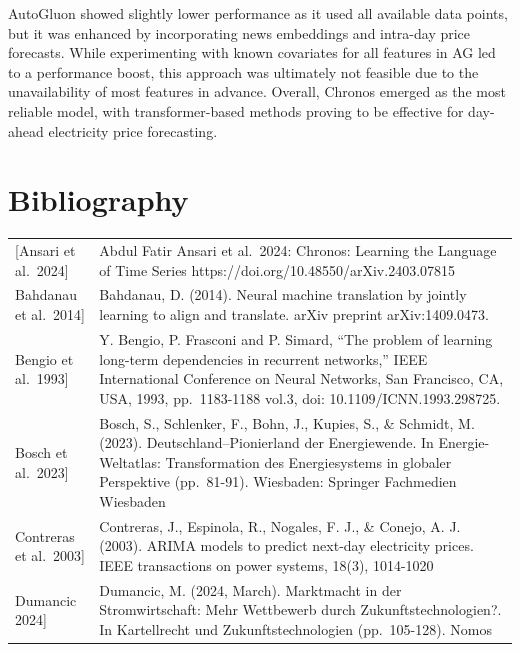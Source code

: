 \documentclass[a4paper]{article}
\begin{document}
AutoGluon showed slightly lower performance as it used all available
data points, but it was enhanced by incorporating news embeddings and
intra-day price forecasts. While experimenting with known covariates for
all features in AG led to a performance boost, this approach was
ultimately not feasible due to the unavailability of most features in
advance. Overall, Chronos emerged as the most reliable model, with
transformer-based methods proving to be effective for day-ahead
electricity price forecasting.

    \newpage
\section{Bibliography}\label{bibliography}

{\fontsize{8pt}{10pt}\selectfont\begin{longtable}[]{@{}
  >{\raggedright\arraybackslash}p{}
  >{\raggedright\arraybackslash}p{}@{}}
\toprule\noalign{}
\endhead
\bottomrule\noalign{}
\endlastfoot
{[}Ansari et al.~2024{]} & Abdul Fatir Ansari et al.~2024: Chronos:
Learning the Language of Time Series
https://doi.org/10.48550/arXiv.2403.07815 \\
{[}Bahdanau et al.~2014{]} & Bahdanau, D. (2014). Neural machine
translation by jointly learning to align and translate. arXiv preprint
arXiv:1409.0473. \\
{[}Bengio et al.~1993{]} & Y. Bengio, P. Frasconi and P. Simard, ``The
problem of learning long-term dependencies in recurrent networks,'' IEEE
International Conference on Neural Networks, San Francisco, CA, USA,
1993, pp.~1183-1188 vol.3, doi: 10.1109/ICNN.1993.298725. \\
{[}Bosch et al.~2023{]} & Bosch, S., Schlenker, F., Bohn, J., Kupies,
S., \& Schmidt, M. (2023). Deutschland--Pionierland der Energiewende. In
Energie-Weltatlas: Transformation des Energiesystems in globaler
Perspektive (pp.~81-91). Wiesbaden: Springer Fachmedien Wiesbaden \\
{[}Contreras et al.~2003{]} & Contreras, J., Espinola, R., Nogales, F.
J., \& Conejo, A. J. (2003). ARIMA models to predict next-day
electricity prices. IEEE transactions on power systems, 18(3),
1014-1020 \\
{[}Dumancic 2024{]} & Dumancic, M. (2024, March). Marktmacht in der
Stromwirtschaft: Mehr Wettbewerb durch Zukunftstechnologien?. In
Kartellrecht und Zukunftstechnologien (pp.~105-128). Nomos

\end{longtable}}
\end{document}
